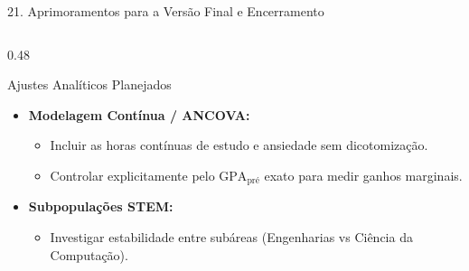 \documentclass[aspectratio=169, 10pt]{beamer}
\begin{document}
\begin{frame}{21. Aprimoramentos para a Versão Final e Encerramento}
    \begin{columns}[T]
        \begin{column}{0.48\textwidth}
            \begin{block}{Ajustes Analíticos Planejados}
                \begin{itemize}\setlength{\itemsep}{5pt}\small
                    \item \textbf{Modelagem Contínua / ANCOVA:}
                    \begin{itemize}\footnotesize
                        \item Incluir as horas contínuas de estudo e ansiedade sem dicotomização.
                        \item Controlar explicitamente pelo $\text{GPA}_{\text{pré}}$ exato para medir ganhos marginais.
                    \end{itemize}
                    \item \textbf{Subpopulações STEM:}
                    \begin{itemize}\footnotesize
                        \item Investigar estabilidade entre subáreas (Engenharias vs Ciência da Computação).
                    \end{itemize}
                \end{itemize}
            \end{block}

        \end{column}


\end{columns}
\end{frame}
\end{document}
